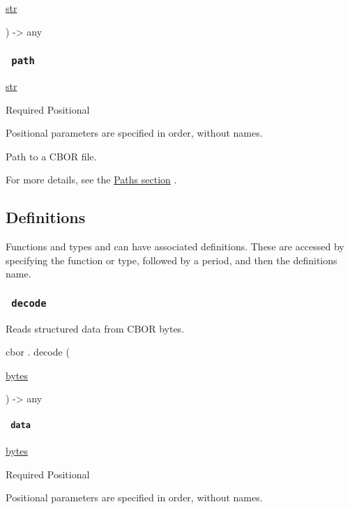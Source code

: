 { \href{/docs/reference/foundations/str/}{str} }

) -\textgreater{} { any }

\subsubsection{\texorpdfstring{\texttt{\ path\ }}{ path }}\label{parameters-path}

\href{/docs/reference/foundations/str/}{str}

{Required} {{ Positional }}

\label{parameters-path-positional-tooltip}
Positional parameters are specified in order, without names.

Path to a CBOR file.

For more details, see the \href{/docs/reference/syntax/\#paths}{Paths
section} .

\subsection{\texorpdfstring{{ Definitions
}}{ Definitions }}\label{definitions}

\label{definitions-tooltip}
Functions and types and can have associated definitions. These are
accessed by specifying the function or type, followed by a period, and
then the definition\textquotesingle s name.

\subsubsection{\texorpdfstring{\texttt{\ decode\ }}{ decode }}\label{definitions-decode}

Reads structured data from CBOR bytes.

cbor { . } { decode } (

{ \href{/docs/reference/foundations/bytes/}{bytes} }

) -\textgreater{} { any }

\paragraph{\texorpdfstring{\texttt{\ data\ }}{ data }}\label{definitions-decode-data}

\href{/docs/reference/foundations/bytes/}{bytes}

{Required} {{ Positional }}

\label{definitions-decode-data-positional-tooltip}
Positional parameters are specified in order, without names.

